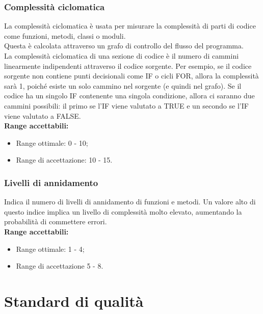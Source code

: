 \documentclass{scalatekids-article}
\begin{document}
\subsubsection{Complessità ciclomatica}
La complessità ciclomatica è usata per misurare la complessità di parti di codice come funzioni, metodi, classi o moduli.\\
Questa è calcolata attraverso un grafo di controllo del flusso del programma.\\La complessità ciclomatica di una sezione di codice è il numero di cammini linearmente indipendenti attraverso il codice sorgente. Per esempio, se il codice sorgente non contiene punti decisionali come IF o cicli FOR, allora la complessità sarà 1, poiché esiste un solo cammino nel sorgente (e quindi nel grafo). Se il codice ha un singolo IF contenente una singola condizione, allora ci saranno due cammini possibili: il primo se l'IF viene valutato a TRUE e un secondo se l'IF viene valutato a FALSE.\\
\textbf{Range accettabili:}
\begin{itemize}
  \item Range ottimale: 0 - 10;
  \item Range di accettazione: 10 - 15.
\end{itemize}
\subsubsection{Livelli di annidamento}
Indica il numero di livelli di annidamento di funzioni e metodi. Un valore alto di questo indice implica un livello di complessità molto elevato, aumentando la probabilità di commettere errori.\\
\textbf{Range accettabili:}
\begin{itemize}
  \item Range ottimale: 1 - 4;
  \item Range di accettazione 5 - 8.
\end{itemize}
\newpage
\appendix
\section{Standard di qualità}
\end{document}
